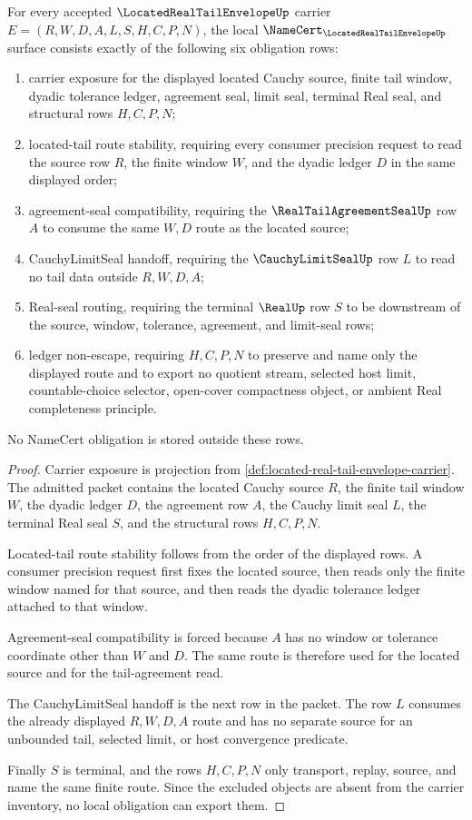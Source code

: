 \begin{theorem}
\label{thm:located-real-tail-envelope-namecert-obligations}
For every accepted $\LocatedRealTailEnvelopeUp$ carrier $E=(R,W,D,A,L,S,H,C,P,N)$, the local $\NameCert_{\LocatedRealTailEnvelopeUp}$ surface consists exactly of the following six obligation rows:
\begin{enumerate}
\item carrier exposure for the displayed located Cauchy source, finite tail window, dyadic tolerance ledger, agreement seal, limit seal, terminal Real seal, and structural rows $H,C,P,N$;
\item located-tail route stability, requiring every consumer precision request to read the source row $R$, the finite window $W$, and the dyadic ledger $D$ in the same displayed order;
\item agreement-seal compatibility, requiring the $\RealTailAgreementSealUp$ row $A$ to consume the same $W,D$ route as the located source;
\item CauchyLimitSeal handoff, requiring the $\CauchyLimitSealUp$ row $L$ to read no tail data outside $R,W,D,A$;
\item Real-seal routing, requiring the terminal $\RealUp$ row $S$ to be downstream of the source, window, tolerance, agreement, and limit-seal rows;
\item ledger non-escape, requiring $H,C,P,N$ to preserve and name only the displayed route and to export no quotient stream, selected host limit, countable-choice selector, open-cover compactness object, or ambient Real completeness principle.
\end{enumerate}
No NameCert obligation is stored outside these rows.
\end{theorem}
\begin{proof}
Carrier exposure is projection from \autoref{def:located-real-tail-envelope-carrier}. The admitted packet contains the located Cauchy source $R$, the finite tail window $W$, the dyadic ledger $D$, the agreement row $A$, the Cauchy limit seal $L$, the terminal Real seal $S$, and the structural rows $H,C,P,N$.

Located-tail route stability follows from the order of the displayed rows. A consumer precision request first fixes the located source, then reads only the finite window named for that source, and then reads the dyadic tolerance ledger attached to that window.

Agreement-seal compatibility is forced because $A$ has no window or tolerance coordinate other than $W$ and $D$. The same route is therefore used for the located source and for the tail-agreement read.

The CauchyLimitSeal handoff is the next row in the packet. The row $L$ consumes the already displayed $R,W,D,A$ route and has no separate source for an unbounded tail, selected limit, or host convergence predicate.

Finally $S$ is terminal, and the rows $H,C,P,N$ only transport, replay, source, and name the same finite route. Since the excluded objects are absent from the carrier inventory, no local obligation can export them.
\end{proof}

